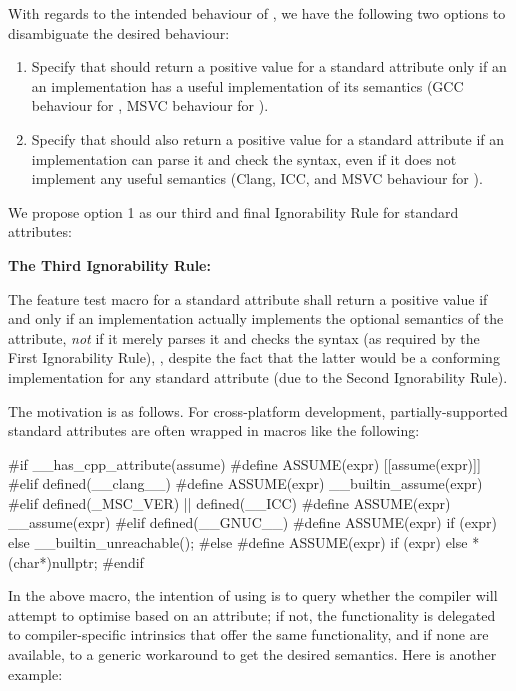 With regards to the intended behaviour of , we have the following two options to disambiguate the desired behaviour:
\begin{enumerate}
\item Specify that  should return a positive value for a standard attribute only if an an implementation has a useful implementation of its semantics (GCC behaviour for , MSVC behaviour for ).
\item Specify that  should also return a positive value for a standard attribute if an implementation can parse it and check the syntax, even if it does not implement any useful semantics (Clang, ICC, and MSVC behaviour for ).
\end{enumerate}

We propose option 1 as our third and final Ignorability Rule for standard attributes:

\begin{adjustwidth}{0.5cm}{0.5cm}
\textbf{The Third Ignorability Rule:}

The feature test macro for a standard attribute shall return a positive value if and only if an implementation actually implements the optional semantics of the attribute, \emph{not} if it merely parses it and checks the syntax (as required by the First Ignorability Rule), , despite the fact that the latter would be a conforming implementation for any standard attribute (due to the Second Ignorability Rule).
\end{adjustwidth}

The motivation is as follows. For cross-platform development, partially-supported standard attributes are often wrapped in macros like the following:

\begin{codeblock}
#if __has_cpp_attribute(assume)
  #define ASSUME(expr) [[assume(expr)]]
#elif defined(__clang__)
  #define ASSUME(expr) __builtin_assume(expr) 
#elif defined(_MSC_VER) || defined(__ICC)
  #define ASSUME(expr) __assume(expr) 
#elif defined(__GNUC__) 
  #define ASSUME(expr) if (expr) {} else { __builtin_unreachable(); }
#else
  #define ASSUME(expr) if (expr) {} else { *(char*)nullptr; }
#endif
\end{codeblock}

In the above macro, the intention of using  is to query whether the compiler will attempt to optimise based on an  attribute; if not, the functionality is delegated to compiler-specific intrinsics that offer the same functionality, and if none are available, to a generic workaround to get the desired semantics. Here is another example:

